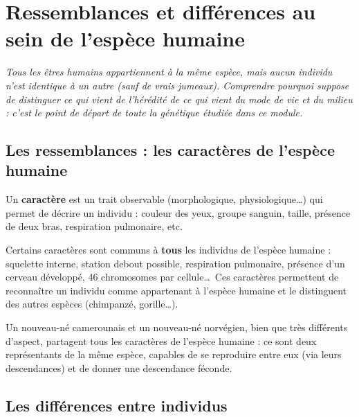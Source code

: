 \chapter{Ressemblances et différences au sein de l'espèce humaine}

\noindent\textit{Tous les êtres humains appartiennent à la même espèce, mais aucun
individu n'est identique à un autre (sauf de vrais jumeaux). Comprendre pourquoi
suppose de distinguer ce qui vient de l'hérédité de ce qui vient du mode de vie et du
milieu : c'est le point de départ de toute la génétique étudiée dans ce module.}
\vspace{8pt}

\connecteBanner

\section{Les ressemblances : les caractères de l'espèce humaine}

\begin{definition}[Caractère]
Un \textbf{caractère} est un trait observable (morphologique, physiologique\dots) qui
permet de décrire un individu : couleur des yeux, groupe sanguin, taille, présence de
deux bras, respiration pulmonaire, etc.
\end{definition}

\begin{propriete}
Certains caractères sont communs à \textbf{tous} les individus de l'espèce humaine :
squelette interne, station debout possible, respiration pulmonaire, présence d'un
cerveau développé, 46 chromosomes par cellule\dots\ Ces caractères permettent de
reconnaître un individu comme appartenant à l'espèce humaine et le distinguent des
autres espèces (chimpanzé, gorille\dots).
\end{propriete}

\begin{exemple}
Un nouveau-né camerounais et un nouveau-né norvégien, bien que très différents
d'aspect, partagent tous les caractères de l'espèce humaine : ce sont deux
représentants de la même espèce, capables de se reproduire entre eux (via leurs
descendances) et de donner une descendance féconde.
\end{exemple}

\section{Les différences entre individus}

